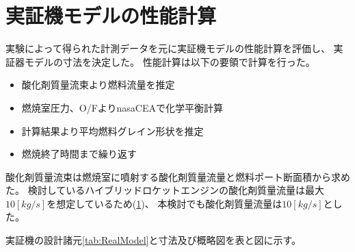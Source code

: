 \section{実証機モデルの性能計算}
実験によって得られた計測データを元に実証機モデルの性能計算を評価し、
実証器モデルの寸法を決定した。
性能計算は以下の要領で計算を行った。
\begin{itemize}
\item 酸化剤質量流束より燃料流量を推定
\item 燃焼室圧力、O/FよりnasaCEAで化学平衡計算
\item 計算結果より平均燃料グレイン形状を推定
\item 燃焼終了時間まで繰り返す
\end{itemize}
酸化剤質量流束は燃焼室に噴射する酸化剤質量流量と燃料ポート断面積から求めた。
検討しているハイブリッドロケットエンジンの酸化剤質量流量は最大$10[kg/s]$を想定しているため(\ref{})、
本検討でも酸化剤質量流量は$10[kg/s]$とした。

実証機の設計諸元\ref{tab:RealModel}と寸法及び概略図を表と図に示す。
